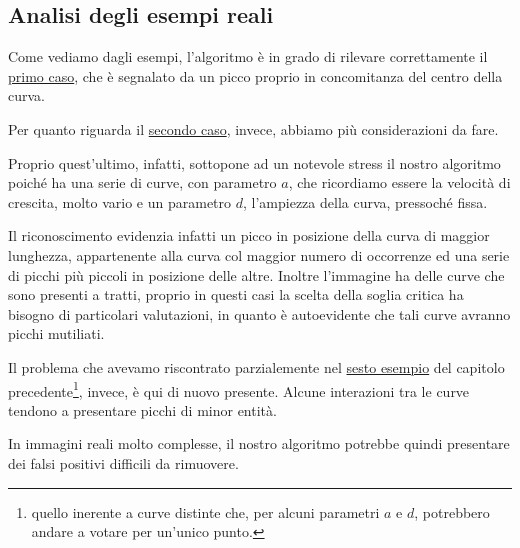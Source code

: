 \subsection{Analisi degli esempi reali}
Come vediamo dagli esempi, l'algoritmo è in grado di rilevare correttamente il \hyperref[fig:reale_ostinelli_1]{primo caso}, che è segnalato da un picco proprio in concomitanza del centro della curva.\par
Per quanto riguarda il \hyperref[fig:reale_ostinelli_2]{secondo caso}, invece, abbiamo più considerazioni da fare.\par
Proprio quest'ultimo, infatti, sottopone ad un notevole stress il nostro algoritmo poiché ha una serie di curve, con parametro $a$, che ricordiamo essere la velocità di crescita, molto vario e un parametro $d$, l'ampiezza della curva, pressoché fissa.\par
Il riconoscimento evidenzia infatti un picco in posizione della curva di maggior lunghezza, appartenente alla curva col maggior numero di occorrenze ed una serie di picchi più piccoli in posizione delle altre. Inoltre l'immagine ha delle curve che sono presenti a tratti, proprio in questi casi la scelta della soglia critica ha bisogno di particolari valutazioni, in quanto è autoevidente che tali curve avranno picchi mutiliati.\par
Il problema che avevamo riscontrato parzialemente nel \hyperref[fig:sintentica_ostinelli_6]{sesto esempio} del capitolo precedente\footnote{quello inerente a curve distinte che, per alcuni parametri $a$ e $d$, potrebbero andare a votare per un'unico punto.}, invece, è qui di nuovo presente. Alcune interazioni tra le curve tendono a presentare picchi di minor entità.\par
In immagini reali molto complesse, il nostro algoritmo potrebbe quindi presentare dei falsi positivi difficili da rimuovere.

